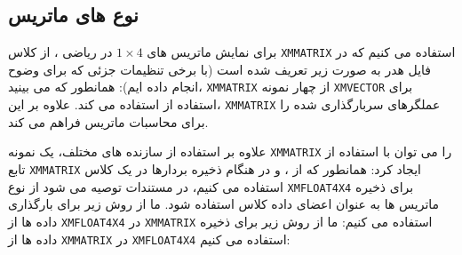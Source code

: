 \subsection{\textbf{نوع های ماتریس}}
{
    \Large
    \begin{spacing}{1.5}
        برای نمایش ماتریس های $1\times 4$ در ریاضی ، از کلاس \texttt{XMMATRIX} استفاده می کنیم که در فایل هدر  به صورت زیر تعریف شده است (با برخی تنظیمات جزئی که برای وضوح انجام داده ایم):
        \textbf{\vspace{6pt}}
        \lr{}
        \textbf{\vspace{6pt}}
        همانطور که می بینید، \texttt{XMMATRIX} از چهار نمونه \texttt{XMVECTOR} برای استفاده از  استفاده می کند. علاوه بر این، \texttt{XMMATRIX} عملگرهای سربارگذاری شده را برای محاسبات ماتریس فراهم می کند.

        علاوه بر استفاده از سازنده های مختلف، یک نمونه \texttt{XMMATRIX} را می توان با استفاده از تابع \texttt{XMMATRIX} ایجاد کرد:
        \textbf{\vspace{6pt}}
        \lr{}
        \textbf{\vspace{6pt}}
        همانطور که از ،  و  در هنگام ذخیره بردارها در یک کلاس استفاده می کنیم،
        در مستندات  توصیه می شود از نوع \texttt{XMFLOAT4X4} برای ذخیره ماتریس ها به عنوان اعضای داده کلاس استفاده شود.
        \textbf{\vspace{6pt}}
        \lr{}
        \textbf{\vspace{6pt}}
        ما از روش زیر برای بارگذاری داده ها از \texttt{XMFLOAT4X4} در \texttt{XMMATRIX} استفاده می کنیم:
        \textbf{\vspace{6pt}}
        \lr{}
        \textbf{\vspace{6pt}}
        ما از روش زیر برای ذخیره داده ها از \texttt{XMMATRIX} در \texttt{XMFLOAT4X4} استفاده می کنیم:
        \textbf{\vspace{6pt}}
        \lr{}
    \end{spacing}
}

